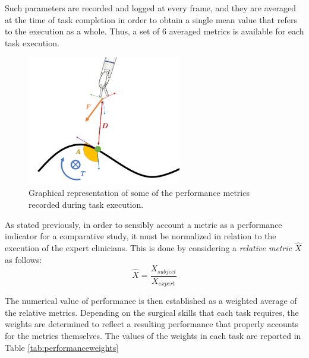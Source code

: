\documentclass[../main.tex]{subfiles}
\begin{document}
Such parameters are recorded and logged at every frame, and they are averaged at the time of task completion in order to obtain a single mean value that refers to the execution as a whole. Thus, a set of 6 averaged metrics is available for each task execution.

\begin{figure}
    \centering
    \includegraphics[width=0.6\textwidth]{images/metrics.png}
    \caption{Graphical representation of some of the performance metrics recorded during task execution. }
    \label{fig:metrics}
\end{figure}

As stated previously, in order to sensibly account a metric as a performance indicator for a comparative study, it must be normalized in relation to the execution of the expert clinicians. This is done by considering a \textit{relative metric} $\hat{X}$ as follows:
\begin{equation}
    \hat{X} = \frac{X_{subject}}{X_{expert}}
\end{equation}

The numerical value of performance is then established as a weighted average of the relative metrics. Depending on the surgical skills that each task requires, the weights are determined to reflect a resulting performance that properly accounts for the metrics themselves. The values of the weights in each task are reported in Table \ref{tab:performanceweights}
\end{document}
